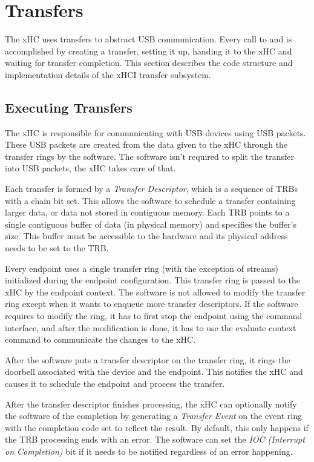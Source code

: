 \section{Transfers}
\label{sec:transfers}

The xHC uses transfers to abstract USB communication. Every call to
 and  is accomplished by creating a transfer,
setting it up, handing it to the xHC and waiting for transfer completion. This
section describes the code structure and implementation details of the xHCI transfer
subsystem.

\subsection{Executing Transfers}

The xHC is responsible for communicating with USB devices using USB packets.
These USB packets are created from the data given to the xHC through the
transfer rings by the software. The software isn't required to split the
transfer into USB packets, the xHC takes care of that.

Each transfer is formed by a \textit{Transfer Descriptor}, which is a sequence
of TRBs with a chain bit set. This allows the software to schedule a transfer
containing larger data, or data not stored in contiguous memory. Each TRB
points to a single contiguous buffer of data (in physical memory) and specifies
the buffer's size. This buffer must be accessible to the hardware and its
physical address needs to be set to the TRB.

Every endpoint uses a single transfer ring (with the exception of streams)
initialized during the endpoint configuration. This transfer ring is passed to
the xHC by the endpoint context. The software is not allowed to modify the
transfer ring except when it wants to enqueue more transfer descriptors. If the
software requires to modify the ring, it has to first stop the endpoint using
the command interface, and after the modification is done, it has to use the
evaluate context command to communicate the changes to the xHC.

After the software puts a transfer descriptor on the transfer ring, it rings
the doorbell associated with the device and the endpoint. This notifies the xHC
and causes it to schedule the endpoint and process the transfer.

After the transfer descriptor finishes processing, the xHC can optionally
notify the software of the completion by generating a \textit{Transfer Event}
on the event ring with the completion code set to reflect the result. By
default, this only happens if the TRB processing ends with an error.
The software can set the \textit{IOC (Interrupt on Completion)} bit if it needs
to be notified regardless of an error happening.

